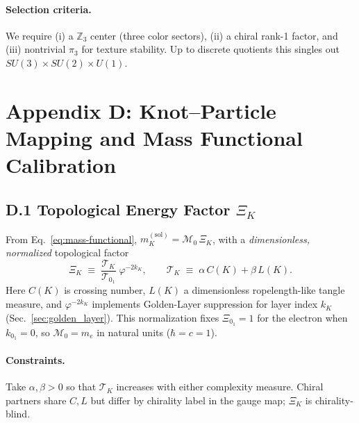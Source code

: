 \documentclass[11pt, preprint,titlepage]{revtex4-2}
\begin{document}
		\paragraph{Selection criteria.}
		We require (i) a \(\mathbb Z_3\) center (three color sectors), (ii) a chiral rank-1 factor, and (iii) nontrivial \(\pi_3\) for texture stability.
		Up to discrete quotients this singles out \(SU(3)\times SU(2)\times U(1)\).

	\section*{Appendix D: Knot–Particle Mapping and Mass Functional Calibration}
	\label{sec:knot-particle-mapping}

		\subsection*{D.1 Topological Energy Factor \texorpdfstring{\(\Xi_K\)}{XiK}}
		From Eq.~\eqref{eq:mass-functional},
		\(m_K^{(\mathrm{sol})}=\mathcal{M}_0\,\Xi_K\),
		with a \emph{dimensionless, normalized} topological factor
		\begin{equation}
		\Xi_K \;\equiv\; \frac{\mathcal{T}_K}{\mathcal{T}_{0_1}}\;\varphi^{-2k_K},
		\qquad \mathcal{T}_K \;\equiv\; \alpha\,C(K) + \beta\,L(K).
		\label{eq:Xi-normalized}
		\end{equation}
		Here \(C(K)\) is crossing number, \(L(K)\) a dimensionless ropelength-like tangle measure, and \(\varphi^{-2k_K}\) implements Golden-Layer suppression for layer index \(k_K\) (Sec.~\ref{sec:golden_layer}). This normalization fixes
		\(\Xi_{0_1}=1\) for the electron when \(k_{0_1}=0\), so \(\mathcal{M}_0=m_e\) in natural units (\(\hbar=c=1\)).

		\paragraph{Constraints.}
		Take \(\alpha,\beta>0\) so that \(\mathcal{T}_K\) increases with either complexity measure.
		Chiral partners share \(C,L\) but differ by chirality label in the gauge map; \(\Xi_K\) is chirality-blind.
\end{document}
